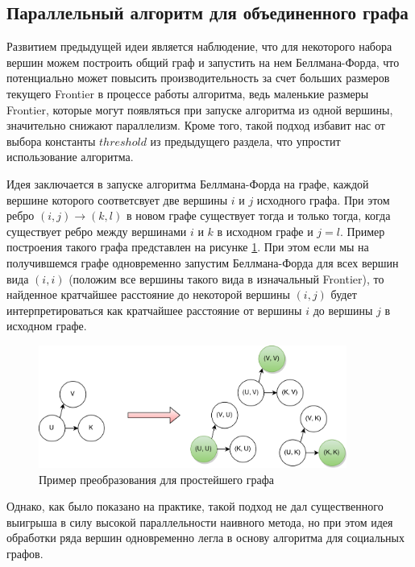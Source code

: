 \FloatBarrier
\subsection{Параллельный алгоритм для объединенного графа}
Развитием предыдущей идеи является наблюдение, что для некоторого набора вершин можем построить общий граф и запустить на нем Беллмана-Форда, что потенциально может повысить производительность за счет больших размеров текущего Frontier в процессе работы алгоритма, ведь маленькие размеры Frontier, которые могут появляться при запуске алгоритма из одной вершины, значительно снижают параллелизм. Кроме того, такой подход избавит нас от выбора константы $threshold$ из предыдущего раздела, что упростит использование алгоритма. 

Идея заключается в запуске алгоритма Беллмана-Форда на графе, каждой вершине которого соответсвует две вершины $i$ и $j$ исходного графа. При этом ребро $(i, j) \rightarrow (k, l)$ в новом графе существует тогда и только тогда, когда существует ребро между вершинами $i$ и $k$ в исходном графе и $j = l$. Пример построения такого графа представлен на рисунке \ref{floyd_par_common_graph}. При этом если мы на получившемся графе одновременно запустим Беллмана-Форда для всех вершин вида $(i, i)$ (положим все вершины такого вида в изначальный Frontier), то найденное кратчайшее расстояние до некоторой вершины $(i, j)$ будет интерпретироваться как кратчайшее расстояние от вершины $i$ до вершины $j$ в исходном графе. 
\FloatBarrier
\begin{figure}[h]
\centering
\includegraphics[width=0.9\textwidth]{img/floyd_par_2.png}
\caption{Пример преобразования для простейшего графа}
\label {floyd_par_common_graph}
\end{figure}
\FloatBarrier

Однако, как было показано на практике, такой подход не дал существенного выигрыша в силу высокой параллельности наивного метода, но при этом идея обработки ряда вершин одновременно легла в основу алгоритма для социальных графов. 

